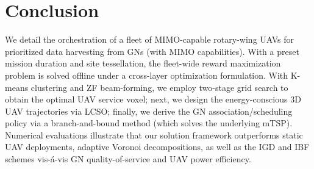 \documentclass[10pt, twocolumn]{IEEEtran}
\begin{document}
\section{Conclusion}\label{S5}
We detail the orchestration of a fleet of MIMO-capable rotary-wing UAVs for prioritized data harvesting from GNs (with MIMO capabilities). With a preset mission duration and site tessellation, the fleet-wide reward maximization problem is solved offline under a cross-layer optimization formulation. With K-means clustering and ZF beam-forming, we employ two-stage grid search to obtain the optimal UAV service voxel; next, we design the energy-conscious $3$D UAV trajectories via LCSO; finally, we derive the GN association/scheduling policy via a branch-and-bound method (which solves the underlying mTSP). Numerical evaluations illustrate that our solution framework outperforms static UAV deployments, adaptive Voronoi decompositions, as well as the IGD and IBF schemes vis-\'{a}-vis GN quality-of-service and UAV power efficiency.
\vspace{-3mm}



\end{document}

